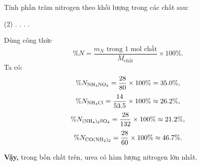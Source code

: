 \begin{tuluyen}
Tính phần trăm nitrogen theo khối lượng trong các chất sau:
\begin{tasks}(2)
\task {}.
\task {}.
\task {}.
\task {}.
\end{tasks}
\begin{loigiaiBT}
Dùng công thức
\[
\%N=\frac{m_N\text{ trong }1\text{ mol chất}}{M_{\text{chất}}}\times100\%.
\]
Ta có:
\[
\%N_{\ce{NH4NO3}}=\frac{28}{80}\times100\%=35.0\%,
\]
\[
\%N_{\ce{NH4Cl}}=\frac{14}{53.5}\times100\%\approx26.2\%,
\]
\[
\%N_{\ce{(NH4)2SO4}}=\frac{28}{132}\times100\%\approx21.2\%,
\]
\[
\%N_{\ce{CO(NH2)2}}=\frac{28}{60}\times100\%\approx46.7\%.
\]

\textbf{Vậy,} trong bốn chất trên, urea có hàm lượng nitrogen lớn nhất.
\end{loigiaiBT}
\end{tuluyen}
